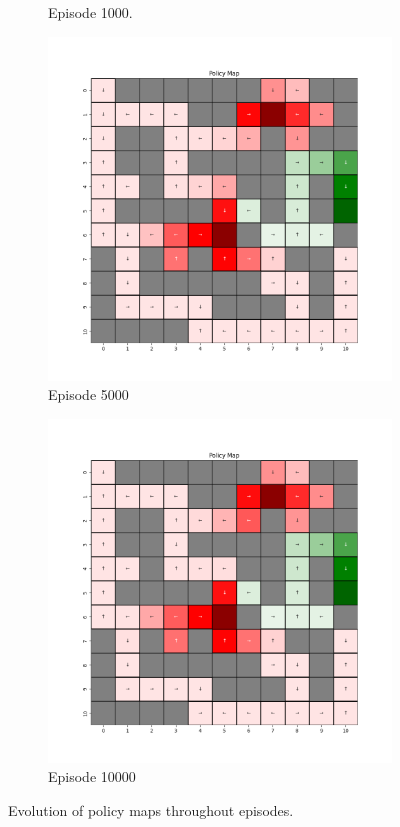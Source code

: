 \documentclass{assignment}
\begin{document}
\begin{figure}[H]
\begin{subfigure}{0.3\textwidth}
    \caption{Episode 1000.}
    \end{subfigure}\hfill
    \begin{subfigure}{0.3\textwidth}
        \includegraphics[width=\textwidth]{figures/policy_td/alpha_sweep/policy_alpha_0.5_gamma_0.95_epsilon_0.2_iteration_5000.png}
    \caption{Episode 5000}
    \end{subfigure}\hfill
    \begin{subfigure}{0.3\textwidth}
        \includegraphics[width=\textwidth]{figures/policy_td/alpha_sweep/policy_alpha_0.5_gamma_0.95_epsilon_0.2_iteration_10000.png}
    \caption{Episode 10000}
    \end{subfigure}
    \caption{Evolution of policy maps throughout episodes.}
    \label{fig:alpha_0.5_td_learning_policy}
\end{figure}
\end{document}
